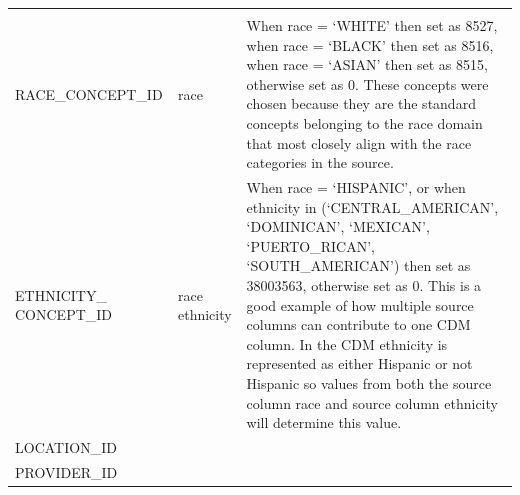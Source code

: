 \documentclass[11pt]{book}
\theoremstyle{definition}
\theoremstyle{definition}
\theoremstyle{definition}
\theoremstyle{remark}
\begin{document}
\begin{longtable}[]{@{}lll@{}}
\begin{minipage}[t]{0.50\columnwidth}
\end{minipage}\tabularnewline
\begin{minipage}[t]{0.28\columnwidth}\raggedright\strut
RACE\_CONCEPT\_ID\strut
\end{minipage} & \begin{minipage}[t]{0.13\columnwidth}\raggedright\strut
race\strut
\end{minipage} & \begin{minipage}[t]{0.50\columnwidth}\raggedright\strut
When race = `WHITE' then set as 8527, when race = `BLACK' then set as
8516, when race = `ASIAN' then set as 8515, otherwise set as 0. These
concepts were chosen because they are the standard concepts belonging to
the race domain that most closely align with the race categories in the
source.\strut
\end{minipage}\tabularnewline
\begin{minipage}[t]{0.28\columnwidth}\raggedright\strut
ETHNICITY\_ CONCEPT\_ID\strut
\end{minipage} & \begin{minipage}[t]{0.13\columnwidth}\raggedright\strut
race ethnicity\strut
\end{minipage} & \begin{minipage}[t]{0.50\columnwidth}\raggedright\strut
When race = `HISPANIC', or when ethnicity in (`CENTRAL\_AMERICAN',
`DOMINICAN', `MEXICAN', `PUERTO\_RICAN', `SOUTH\_AMERICAN') then set as
38003563, otherwise set as 0. This is a good example of how multiple
source columns can contribute to one CDM column. In the CDM ethnicity is
represented as either Hispanic or not Hispanic so values from both the
source column race and source column ethnicity will determine this
value.\strut
\end{minipage}\tabularnewline
\begin{minipage}[t]{0.28\columnwidth}\raggedright\strut
LOCATION\_ID\strut
\end{minipage} & \begin{minipage}[t]{0.13\columnwidth}\raggedright\strut
\strut
\end{minipage} & \begin{minipage}[t]{0.50\columnwidth}\raggedright\strut
\strut
\end{minipage}\tabularnewline
\begin{minipage}[t]{0.28\columnwidth}\raggedright\strut
PROVIDER\_ID\strut
\end{minipage} & \begin{minipage}[t]{0.13\columnwidth}\raggedright\strut

\end{minipage}
\end{longtable}
\end{document}
